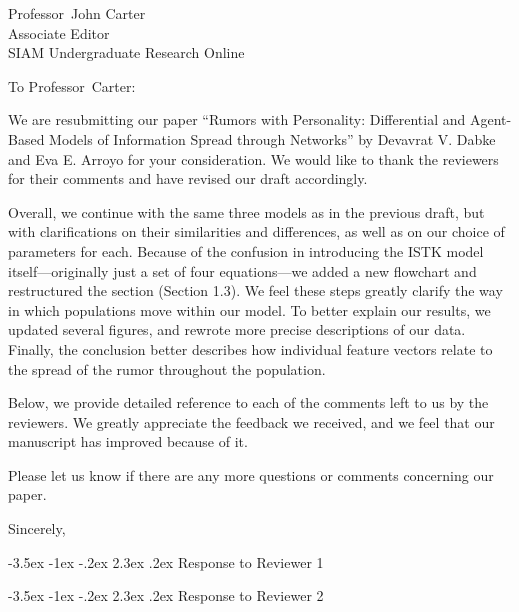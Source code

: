 \documentclass{letter}
\makeatletter
\newcounter{section}
\newcommand\section{\@startsection {section}{1}{\z@}%
                                   {-3.5ex \@plus -1ex \@minus -.2ex}%
                                   {2.3ex \@plus.2ex}%
                                   {\normalfont\Large\bfseries}}
\renewcommand{\closing}[1]{\par\nobreak\vspace{\parskip}%
  \stopbreaks
  \noindent
  \ifx\@empty\fromaddress\else
  \hspace*{\longindentation}\fi
  \parbox{\indentedwidth}{\raggedright
       \ignorespaces #1\\[2\medskipamount]%
       \ifx\@empty\fromsig
           \fromname
       \else \fromsig \fi\strut}%
   \par}
\makeatother
\begin{document}
\begin{letter}{Professor\ John Carter\\
Associate Editor\\
SIAM Undergraduate Research Online\\}
\opening{To Professor\ Carter:}

We are resubmitting our paper ``Rumors with Personality: Differential and Agent-Based Models of Information Spread through Networks'' by Devavrat V. Dabke and Eva E. Arroyo for your consideration.
We would like to thank the reviewers for their comments and have revised our draft accordingly.

Overall, we continue with the same three models as in the previous draft, but with clarifications on their similarities and differences, as well as on our choice of parameters for each.
Because of the confusion in introducing the ISTK model itself---originally just a set of four equations---we added a new flowchart and restructured the section (Section 1.3).
We feel these steps greatly clarify the way in which populations move within our model.
To better explain our results, we updated several figures, and rewrote more precise descriptions of our data.
Finally, the conclusion better describes how individual feature vectors relate to the spread of the rumor throughout the population.

Below, we provide detailed reference to each of the comments left to us by the reviewers.
We greatly appreciate the feedback we received, and we feel that our manuscript has improved because of it.

Please let us know if there are any more questions or comments concerning our paper.

\vspace{12pt}
\closing{Sincerely,}

\section{Response to Reviewer 1}



\section{Response to Reviewer 2}










\end{letter}
\end{document}
